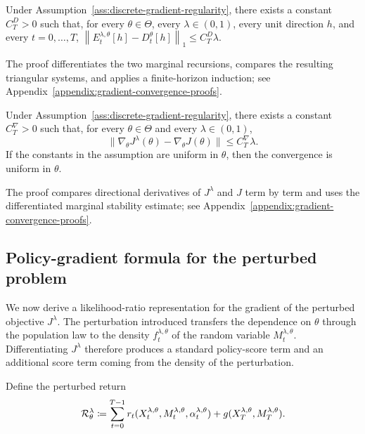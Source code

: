 \begin{lemma}
    Under Assumption~\ref{ass:discrete-gradient-regularity}, there exists a constant $C_T^D > 0$ such that, for every $\theta\in\Theta$, every $\lambda\in(0,1)$, every unit direction $h$, and every $t=0,\ldots,T$, $\left\|E_t^{\lambda,\theta}[h] - D_t^\theta[h] \right\|_1 \leq C_T^D\lambda$.
\end{lemma}

The proof differentiates the two marginal recursions, compares the resulting triangular systems, and applies a finite-horizon induction; see Appendix~\ref{appendix:gradient-convergence-proofs}.

\begin{theorem}
    \label{theorem:discrete-gradient-convergence}
    Under Assumption~\ref{ass:discrete-gradient-regularity}, there exists a constant $C_T^\nabla > 0$ such that, for every $\theta\in\Theta$ and every $\lambda\in(0,1)$, $$\|\nabla_\theta J^\lambda(\theta) - \nabla_\theta J(\theta)\| \leq C_T^\nabla \lambda.$$
    If the constants in the assumption are uniform in $\theta$, then the convergence is uniform in $\theta$.
\end{theorem}

The proof compares directional derivatives of $J^\lambda$ and $J$ term by term and uses the differentiated marginal stability estimate; see Appendix~\ref{appendix:gradient-convergence-proofs}.

\subsection{Policy-gradient formula for the perturbed problem}

We now derive a likelihood-ratio representation for the gradient of the perturbed objective $J^\lambda$. The perturbation introduced transfers the dependence on $\theta$ through the population law to the density $f_t^{\lambda,\theta}$ of the random variable $M_t^{\lambda,\theta}$. Differentiating $J^\lambda$ therefore produces a standard policy-score term and an additional score term coming from the density of the perturbation.

Define the perturbed return
\begin{align}
    {\cal R}_\theta^\lambda \coloneqq \sum_{t=0}^{T-1} r_t(X_t^{\lambda,\theta}, M_t^{\lambda,\theta}, \alpha_t^{\lambda,\theta}) + g(X_T^{\lambda,\theta}, M_T^{\lambda,\theta}).
\end{align}

